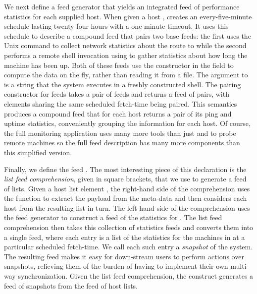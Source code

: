 We next define a feed generator  that yields an
integrated feed of performance statistics for each supplied host.
When given a host ,  creates an every-five-minute
schedule lasting twenty-four hours with a one minute timeout. It uses
this schedule to describe a compound feed that pairs two base feeds:
the first uses the Unix command  to collect network
statistics about the route to  while the second performs a
remote shell invocation using  to gather statistics about how
long the machine has been up.  Both of these feeds use the 
constructor in the  field to compute the data on the fly,
rather than reading it from a file.  The argument to  is a
string that the system executes in a freshly constructed shell.  The
pairing constructor for feeds takes a pair of feeds and returns a feed
of pairs, with elements sharing the same scheduled fetch-time being
paired. This semantics produces a compound feed that for each host
returns a pair of its ping and uptime statistics, conveniently
grouping the information for each host.  Of course, the full
\vizGems{} monitoring application uses many more tools than just 
and  to probe remote machines so the full feed description 
has many more components than this simplified version.


Finally, we define the feed .  The most interesting piece
of this declaration is the {\em list feed comprehension}, given in
square brackets, that we use to generate a feed of lists. 
Given a host list element , the right-hand side of the comprehension
uses the  function to extract the payload from the meta-data and
then considers each host  from the resulting list in turn.  The left-hand side of
the comprehension uses the  feed generator to construct
a feed of the statistics for .  The list feed comprehension then
takes this collection of statistics feeds and converts them into a
single feed, where each entry is a list of the statistics for
the machines in  at a particular scheduled fetch-time.  
We call each such entry a \textit{snapshot} of the system.
The resulting feed makes it easy for down-stream users to perform
actions over snapshots, relieving them of the burden of having to
implement their own multi-way synchronization.
Given the list feed comprehension, the  construct
generates a feed of snapshots from the feed of host lists.  

